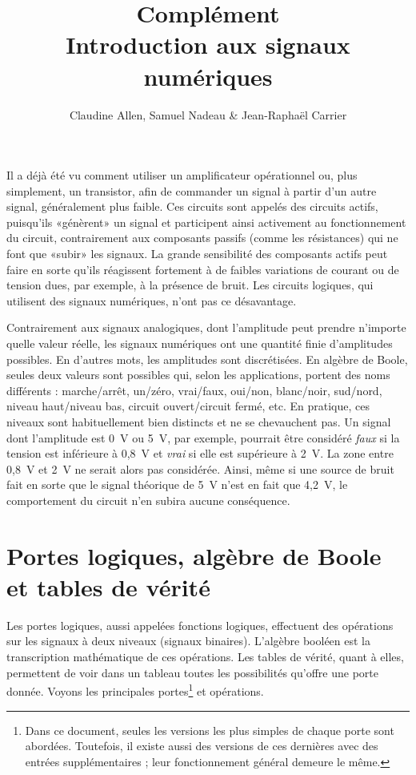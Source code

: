 \documentclass[canadien,12pt,oneside,letterpaper]{article}
\begin{document}
 
\title{\textbf{Complément}\\Introduction aux signaux numériques}
\author{Claudine Allen, Samuel Nadeau \& Jean-Raphaël Carrier}
\date{}
\maketitle


Il a déjà été vu comment utiliser un amplificateur opérationnel ou, plus simplement, un transistor, afin de commander un signal à partir d'un autre signal, généralement plus faible. Ces circuits sont appelés des circuits actifs, puisqu'ils «génèrent» un signal et participent ainsi activement au fonctionnement du circuit, contrairement aux composants passifs (comme les résistances) qui ne font que «subir» les signaux. La grande sensibilité des composants actifs peut faire en sorte qu'ils réagissent fortement à de faibles variations de courant ou de tension dues, par exemple, à la présence de bruit. Les circuits logiques, qui utilisent des signaux numériques, n'ont pas ce désavantage.

Contrairement aux signaux analogiques, dont l'amplitude peut prendre n'importe quelle valeur réelle, les signaux numériques ont une quantité finie d'amplitudes possibles. En d'autres mots, les amplitudes sont discrétisées. En algèbre de Boole, seules deux valeurs sont possibles qui, selon les applications, portent des noms différents : marche/arrêt, un/zéro, vrai/faux, oui/non, blanc/noir, sud/nord, niveau haut/niveau bas, circuit ouvert/circuit fermé, etc. En pratique, ces niveaux sont habituellement bien distincts et ne se chevauchent pas. Un signal dont l'amplitude est 0~V ou 5~V, par exemple, pourrait être considéré \textit{faux} si la tension est inférieure à 0,8~V et \textit{vrai} si elle est supérieure à 2~V. La zone entre 0,8~V et 2~V ne serait alors pas considérée. Ainsi, même si une source de bruit fait en sorte que le signal théorique de 5~V n'est en fait que 4,2~V, le comportement du circuit n'en subira aucune conséquence.


\section{Portes logiques, algèbre de Boole et tables de vérité}

Les portes logiques, aussi appelées fonctions logiques, effectuent des opérations sur les signaux à deux niveaux (signaux binaires). L'algèbre booléen est la transcription mathématique de ces opérations. Les tables de vérité, quant à elles, permettent de voir dans un tableau toutes les possibilités qu'offre une porte donnée. Voyons les principales portes\footnote{Dans ce document, seules les versions les plus simples de chaque porte sont abordées. Toutefois, il existe aussi des versions de ces dernières avec des entrées supplémentaires ; leur fonctionnement général demeure le même.} et opérations.
\end{document}
